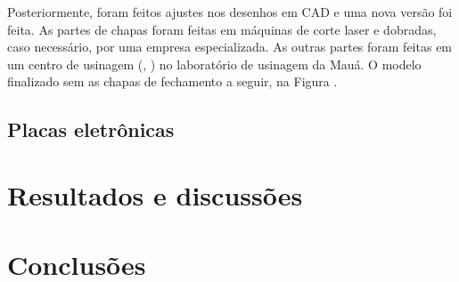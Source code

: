 \documentclass[
	12pt,				%
	openany,			%
	twoside,			%
	a4paper,			%
	english,			%
	french,				%
	spanish,			%
	brazil,				%
	oldfontcommands
	]{abntex2}
\begin{document}

Posteriormente, foram feitos ajustes nos desenhos em CAD e uma nova versão foi feita. As partes de chapas foram feitas em máquinas de corte laser e dobradas, caso necessário, por uma empresa especializada. As outras partes foram feitas em um centro de usinagem (, ) no laboratório de usinagem da Mauá. O modelo finalizado sem as chapas de fechamento a seguir, na Figura .

%	

\section{Placas eletrônicas}



\chapter[Resultados e discussões]{Resultados e discussões}

\chapter[Conclusões]{Conclusões}


\end{document}
